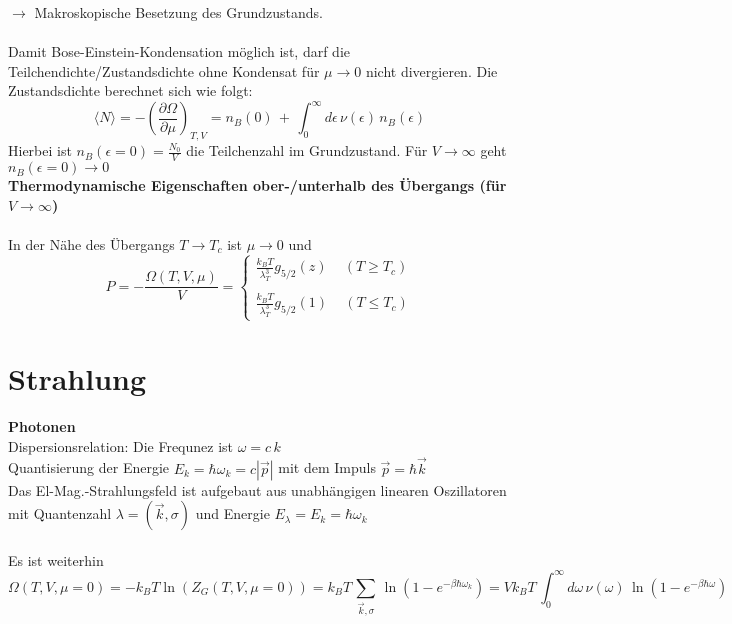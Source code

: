 \documentclass[a4paper,11pt]{scrartcl}
\begin{document}
$\rightarrow$ Makroskopische Besetzung des Grundzustands.\\
\\
Damit Bose-Einstein-Kondensation möglich ist, darf die Teilchendichte/Zustandsdichte ohne Kondensat für $ \mu \rightarrow 0$ nicht divergieren. 
Die Zustandsdichte berechnet sich wie folgt: 
\begin{equation}
 \langle N \rangle = - \left( \frac{\partial \Omega}{\partial \mu} \right)_{T, V} = n_B(0)\, + \, \int_0^{\infty} d \epsilon \, \nu (\epsilon) \, n_B (\epsilon)
\end{equation}
Hierbei ist $ n_B(\epsilon =0) = \frac{N_0}{V}$ die Teilchenzahl im Grundzustand. Für $V \rightarrow \infty $ geht $ n_B(\epsilon =0) \rightarrow 0$\\

\textbf{Thermodynamische Eigenschaften ober-/unterhalb des Übergangs (für $V \rightarrow \infty$)}\\
\\
In der Nähe des Übergangs $T \rightarrow T_c$ ist $\mu \rightarrow 0$ und
\begin{equation}
  P = - \frac{\Omega (T,V, \mu)}{V} =  \left\{ \begin{array}{c} 
  \frac{k_B T}{\lambda_T^3} g_{5/2}(z) \,\,\,\,\,\,\, (T \geq T_c) \\ \\ 
  \frac{k_B T}{\lambda_T^3} g_{5/2}(1) \,\,\,\,\,\,\, (T \leq T_c)
  \end{array} \right.
\end{equation}

\section{Strahlung}
\textbf{Photonen}\\
Dispersionsrelation: Die Frequnez ist $ \omega = c \, k$\\
Quantisierung der Energie $E_k = \hbar \omega_k = c | \vec{p}| $ mit dem Impuls $\vec{p} = \hbar \vec{k}$\\
Das El-Mag.-Strahlungsfeld ist aufgebaut aus unabhängigen linearen Oszillatoren mit Quantenzahl $\lambda = (\vec{k}, \sigma)$ und Energie $E_{\lambda} = E_k = \hbar \omega_k$\\
\\
Es ist weiterhin 
\begin{equation}
 \Omega(T,V, \mu = 0) = - k_B T \ln(Z_G(T, V, \mu=0)) = k_B T \, \sum_{\vec{k}, \sigma} \, \ln(1- e^{- \beta \hbar \omega_k}) = V k_B T \, \int_0^{\infty} d \omega \, \nu(\omega) \, \ln(1-e^{-\beta \hbar \omega})
\end{equation}
\end{document}
